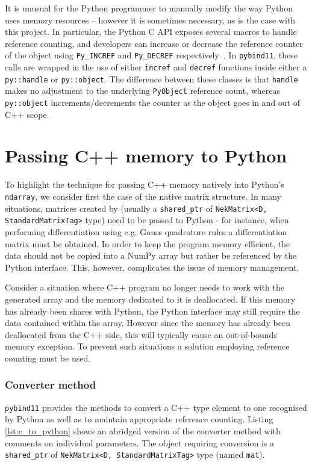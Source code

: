It is unusual for the Python programmer to manually modify the way Python uses
memory resources -- however it is sometimes necessary, as is the case with this
project. In particular, the Python C API exposes several macros to handle
reference counting, and developers can increase or decrease the reference
counter of the object using \texttt{Py\_INCREF} and \texttt{Py\_DECREF}
respectively~\cite{PythonManualMemory}. In \texttt{pybind11}, these calls are
wrapped in the use of either \texttt{incref} and \texttt{decref} functions
inside either a \texttt{py::handle} or \texttt{py::object}. The difference
between these classes is that \texttt{handle} makes no adjustment to the
underlying \texttt{PyObject} reference count, whereas \texttt{py::object}
increments/decrements the counter as the object goes in and out of C++ scope.

\section{Passing C++ memory to Python}

To highlight the technique for passing C++ memory natively into Python's
\texttt{ndarray}, we consider first the case of the native \nek{} matrix
structure. In many situations, matrices created by \nek{} (usually a
\texttt{shared\_ptr} of \texttt{NekMatrix<D, StandardMatrixTag>} type) need to
be passed to Python - for instance, when performing differentiation using
e.g. Gauss quadrature rules a differentiation matrix must be obtained. In order
to keep the program memory efficient, the data should not be copied into a NumPy
array but rather be referenced by the Python interface. This, however,
complicates the issue of memory management.

Consider a situation where C++ program no longer needs to work with the
generated array and the memory dedicated to it is deallocated. If this memory
has already been shares with Python, the Python interface may still require the
data contained within the array. However since the memory has already been
deallocated from the C++ side, this will typically cause an out-of-bounds memory
exception. To prevent such situations a solution employing reference counting
must be used.

\subsubsection{Converter method}

\texttt{pybind11} provides the methods to convert a C++ type element to one
recognised by Python as well as to maintain appropriate reference
counting. Listing \ref{lst:c_to_python} shows an abridged version of the
converter method with comments on individual parameters. The object requiring
conversion is a \texttt{shared\_ptr} of \texttt{NekMatrix<D, StandardMatrixTag>}
type (named \texttt{mat}).

